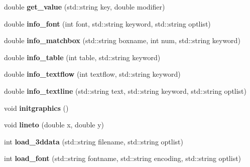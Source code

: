 \begin{DoxyCompactItemize}
\item 
\hypertarget{classPDFlib_a203140e53fe8f2e3660f2173a88c6f5b}{double {\bfseries get\-\_\-value} (std\-::string key, double modifier)}\label{classPDFlib_a203140e53fe8f2e3660f2173a88c6f5b}

\item 
\hypertarget{classPDFlib_a4691e67c4af969f8a30a27c67d0c7281}{double {\bfseries info\-\_\-font} (int font, std\-::string keyword, std\-::string optlist)}\label{classPDFlib_a4691e67c4af969f8a30a27c67d0c7281}

\item 
\hypertarget{classPDFlib_ab87d9425f72659393e4c82a3b70ad29e}{double {\bfseries info\-\_\-matchbox} (std\-::string boxname, int num, std\-::string keyword)}\label{classPDFlib_ab87d9425f72659393e4c82a3b70ad29e}

\item 
\hypertarget{classPDFlib_a8b9bee8fcc7b13463c134aadc202f237}{double {\bfseries info\-\_\-table} (int table, std\-::string keyword)}\label{classPDFlib_a8b9bee8fcc7b13463c134aadc202f237}

\item 
\hypertarget{classPDFlib_a8c325dd615c090dbc8c3a1a2c6be1c27}{double {\bfseries info\-\_\-textflow} (int textflow, std\-::string keyword)}\label{classPDFlib_a8c325dd615c090dbc8c3a1a2c6be1c27}

\item 
\hypertarget{classPDFlib_a5ae97dc66793508bab806074eb3aaf8e}{double {\bfseries info\-\_\-textline} (std\-::string text, std\-::string keyword, std\-::string optlist)}\label{classPDFlib_a5ae97dc66793508bab806074eb3aaf8e}

\item 
\hypertarget{classPDFlib_abafce63a807f731025f6425f1cbf0702}{void {\bfseries initgraphics} ()}\label{classPDFlib_abafce63a807f731025f6425f1cbf0702}

\item 
\hypertarget{classPDFlib_a2b424210d5622820e27cf6f089003b06}{void {\bfseries lineto} (double x, double y)}\label{classPDFlib_a2b424210d5622820e27cf6f089003b06}

\item 
\hypertarget{classPDFlib_aea233d27c34fa1e9d60e9bc27278e27c}{int {\bfseries load\-\_\-3ddata} (std\-::string filename, std\-::string optlist)}\label{classPDFlib_aea233d27c34fa1e9d60e9bc27278e27c}

\item 
\hypertarget{classPDFlib_a7a3fb08e85e9adbe33b834c82d9a7546}{int {\bfseries load\-\_\-font} (std\-::string fontname, std\-::string encoding, std\-::string optlist)}\label{classPDFlib_a7a3fb08e85e9adbe33b834c82d9a7546}


\end{DoxyCompactItemize}
